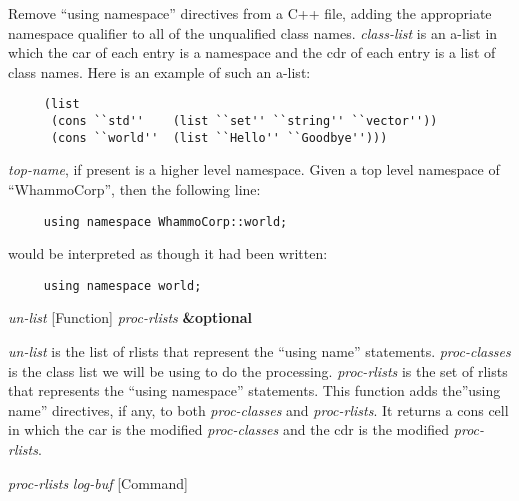 \begin{doc-string}
Remove ``using namespace'' directives from a C++ file, adding the appropriate
namespace qualifier to all of the unqualified class names.  \emph{class-list} is an
a-list in which the car of each entry is a namespace and the cdr of each entry
is a list of class names.  Here is an example of such an a-list:

\small{\begin{verbatim}
     (list
      (cons ``std''    (list ``set'' ``string'' ``vector''))
      (cons ``world''  (list ``Hello'' ``Goodbye'')))
\end{verbatim}}

\emph{top-name}, if present is a higher level namespace.  Given a top level namespace
of ``WhammoCorp'', then the following line:

\small{\begin{verbatim}
     using namespace WhammoCorp::world;
\end{verbatim}}

would be interpreted as though it had been written:

\small{\begin{verbatim}
     using namespace world;
\end{verbatim}}
\end{doc-string}

\vspace{1em}
\noindent
{}
\usebox{\funcname}\emph{un-list}
 \hfill [Function]
\hspace*{\wd\funcname}\emph{proc-rlists}
\hspace*{\wd\funcname}\textbf{\&optional}
\hspace*{\wd\funcname}

\begin{doc-string}
\emph{un-list} is the list of rlists that represent the ``using name'' statements.
\emph{proc-classes} is the class list we will be using to do the processing.
\emph{proc-rlists} is the set of rlists that represents the ``using namespace''
statements.  This function adds the''using name'' directives, if any, to both
\emph{proc-classes} and \emph{proc-rlists}.  It returns a cons cell in which the car is the
modified \emph{proc-classes} and the cdr is the modified \emph{proc-rlists}.
\end{doc-string}

\vspace{1em}
\noindent
{}
\usebox{\funcname}\emph{proc-rlists} \emph{log-buf}
 \hfill [Command]

